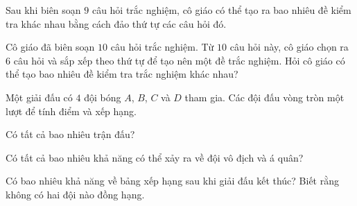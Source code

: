 \begin{bt}%
	Sau khi biên soạn $9$ câu hỏi trắc nghiệm, cô giáo có thể tạo ra bao nhiêu đề kiểm tra khác nhau bằng cách đảo thứ tự các câu hỏi đó.
\end{bt}

\begin{bt}%
	Cô giáo đã biên soạn $10$ câu hỏi trắc nghiệm. Từ $10$ câu hỏi này, cô giáo chọn ra $6$ câu hỏi và sắp xếp theo thứ tự để tạo nên một đề trắc nghiệm. Hỏi cô giáo có thể tạo bao nhiêu đề kiểm tra trắc nghiệm khác nhau?
\end{bt}

\begin{bt}%
	Một giải đấu có $4$ đội bóng $A$, $B$, $C$ và $D$ tham gia. Các đội đấu vòng tròn một lượt để tính điểm và xếp hạng.
	\begin{listEX}[1]
		\item Có tất cả bao nhiêu trận đấu?
		\item Có tất cả bao nhiêu khả năng có thể xảy ra về đội vô địch và á quân?
		\item Có bao nhiêu khả năng về bảng xếp hạng sau khi giải đấu kết thúc? Biết rằng không có hai đội nào đồng hạng.
	\end{listEX}
\end{bt}

